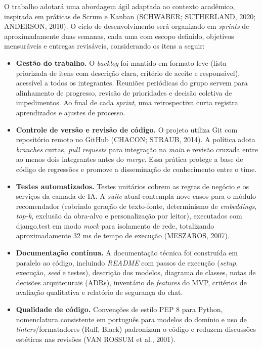 \documentclass[
]{article}
\begin{document}
O trabalho adotará uma abordagem ágil adaptada ao contexto acadêmico,
inspirada em práticas de Scrum e Kanban (SCHWABER; SUTHERLAND, 2020;
ANDERSON, 2010). O ciclo de desenvolvimento será organizado em
\emph{sprints} de aproximadamente duas semanas, cada uma com escopo
definido, objetivos mensuráveis e entregas revisáveis, considerando os
itens a seguir:

\begin{itemize}
\item
  \textbf{Gestão do trabalho.} O \emph{backlog} foi mantido em formato
  leve (lista priorizada de itens com descrição clara, critério de
  aceite e responsável), acessível a todos os integrantes. Reuniões
  periódicas do grupo servem para alinhamento de progresso, revisão de
  prioridades e decisão coletiva de impedimentos. Ao final de cada
  \emph{sprint}, uma retrospectiva curta registra aprendizados e ajustes
  de processo.
\item
  \textbf{Controle de versão e revisão de código.} O projeto utiliza Git
  com repositório remoto no GitHub (CHACON; STRAUB, 2014). A política
  adota \emph{branches} curtas, \emph{pull requests} para integração na
  \emph{main} e revisão cruzada entre ao menos dois integrantes antes do
  \emph{merge}. Essa prática protege a base de código de regressões e
  promove a disseminação de conhecimento entre o time.
\item
  \textbf{Testes automatizados.} Testes unitários cobrem as regras de
  negócio e os serviços da camada de IA. A \emph{suite} atual contempla
  nove casos para o módulo recomendador (cobrindo geração de
  texto-fonte, determinismo de \emph{embeddings}, \emph{top-k}, exclusão
  da obra-alvo e personalização por leitor), executados com django.test
  em modo \emph{mock} para isolamento de rede, totalizando
  aproximadamente 32 ms de tempo de execução (MESZAROS, 2007).
\item
  \textbf{Documentação contínua.} A documentação técnica foi construída
  em paralelo ao código, incluindo \emph{README} com passos de execução
  (\emph{setup}, execução, \emph{seed} e testes), descrição dos modelos,
  diagrama de classes, notas de decisões arquiteturais (ADRs),
  inventário de \emph{features} do MVP, critérios de avaliação
  qualitativa e relatório de segurança do chat.
\item
  \textbf{Qualidade de código.} Convenções de estilo PEP 8 para Python,
  nomenclatura consistente em português para modelos do domínio e uso de
  \emph{linters}/formatadores (Ruff, Black) padronizam o código e
  reduzem discussões estéticas nas revisões (VAN ROSSUM et al., 2001).
\end{itemize}
\end{document}
